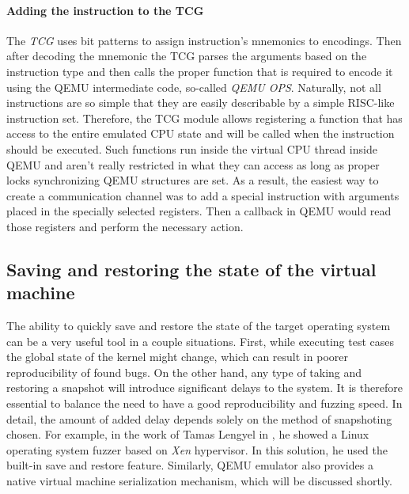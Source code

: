 \paragraph{Adding the instruction to the TCG}
The \textit{TCG} uses bit patterns to assign instruction's mnemonics to encodings. Then after decoding the mnemonic the TCG parses the arguments based on the instruction type and then calls the proper function that is required to encode it using the QEMU intermediate code, so-called \textit{QEMU OPS}. Naturally, not all instructions are so simple that they are easily describable by a simple RISC-like instruction set. Therefore, the TCG module allows registering a function that has access to the entire emulated CPU state and will be called when the instruction should be executed. Such functions run inside the virtual CPU thread inside QEMU and aren't really restricted in what they can access as long as proper locks synchronizing QEMU structures are set. As a result, the easiest way to create a communication channel was to add a special instruction with arguments placed in the specially selected registers. Then a callback in QEMU would read those registers and perform the necessary action.

\subsection{Saving and restoring the state of the virtual machine} \label{sec:savevm}
The ability to quickly save and restore the state of the target operating system can be a very useful tool in a couple situations. First, while executing test cases the global state of the kernel might change, which can result in poorer reproducibility of found bugs. On the other hand, any type of taking and restoring a snapshot will introduce significant delays to the system. It is therefore essential to balance the need to have a good reproducibility and fuzzing speed. In detail, the amount of added delay depends solely on the method of snapshoting chosen. For example, in the work of Tamas Lengyel in \cite{xenfuzz}, he showed a Linux operating system fuzzer based on \textit{Xen} hypervisor. In this solution, he used the built-in save and restore feature. Similarly, QEMU emulator also provides a native virtual machine serialization mechanism, which will be discussed shortly.

